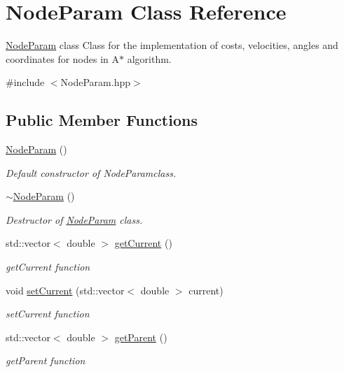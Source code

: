\hypertarget{class_node_param}{}\section{Node\+Param Class Reference}
\label{class_node_param}


\hyperlink{class_node_param}{Node\+Param} class Class for the implementation of costs, velocities, angles and coordinates for nodes in A$\ast$ algorithm.  




{\ttfamily \#include $<$Node\+Param.\+hpp$>$}

\subsection*{Public Member Functions}
\begin{DoxyCompactItemize}
\item 
\hyperlink{class_node_param_a4f80268d34f5c0811db92e45cea28163}{Node\+Param} ()
\begin{DoxyCompactList}\small\item\em Default constructor of Node\+Paramclass. \end{DoxyCompactList}\item 
\hyperlink{class_node_param_ad6eeee163bee98665a25d223e2bb807d}{$\sim$\+Node\+Param} ()
\begin{DoxyCompactList}\small\item\em Destructor of \hyperlink{class_node_param}{Node\+Param} class. \end{DoxyCompactList}\item 
std\+::vector$<$ double $>$ \hyperlink{class_node_param_aedda6fd37a4341d1d2be03e962707e4e}{get\+Current} ()
\begin{DoxyCompactList}\small\item\em get\+Current function \end{DoxyCompactList}\item 
void \hyperlink{class_node_param_a72ef1f23b16ccf9eb0e266123d147718}{set\+Current} (std\+::vector$<$ double $>$ current)
\begin{DoxyCompactList}\small\item\em set\+Current function \end{DoxyCompactList}\item 
std\+::vector$<$ double $>$ \hyperlink{class_node_param_a6f06db02196c42fd3aab6101f3f90500}{get\+Parent} ()
\begin{DoxyCompactList}\small\item\em get\+Parent function \end{DoxyCompactList}\item 

\end{DoxyCompactItemize}
